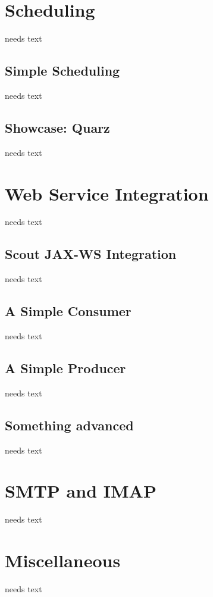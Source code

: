 \documentclass[a4paper,10pt,twoside]{book}
\begin{document}
\section{Scheduling}
needs text

\subsection{Simple Scheduling}
needs text

\subsection{Showcase: Quarz}
needs text
    

\section{Web Service Integration}
needs text

\subsection{Scout JAX-WS Integration}
needs text

\subsection{A Simple Consumer}
needs text

\subsection{A Simple Producer}
needs text

\subsection{Something advanced}
needs text

\section{SMTP and IMAP}
needs text

\section{Miscellaneous}
needs text
\end{document}
